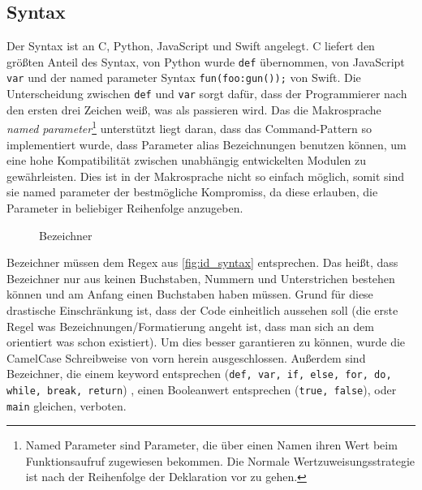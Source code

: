   \subsection{Syntax}
  \label{ssec:Syntax}
    Der Syntax ist an C, Python, JavaScript und Swift angelegt. C liefert den größten Anteil des Syntax, von Python wurde \lstinline[style=MyMacroStyle]$def$ übernommen, von JavaScript \lstinline[style=MyMacroStyle]$var$ und der named parameter Syntax \lstinline[style=MyMacroStyle]$fun(foo:gun());$ von Swift. Die Unterscheidung zwischen \lstinline[style=MyMacroStyle]$def$ und \lstinline[style=MyMacroStyle]$var$ sorgt dafür, dass der Programmierer nach den ersten drei Zeichen weiß, was als passieren wird. Das die Makrosprache \emph{named parameter}\footnote{
      Named Parameter sind Parameter, die über einen Namen ihren Wert beim Funktionsaufruf zugewiesen bekommen. Die Normale Wertzuweisungsstrategie ist nach der Reihenfolge der Deklaration vor zu gehen.
    } unterstützt liegt daran, dass das Command-Pattern so implementiert wurde, dass Parameter alias Bezeichnungen benutzen können, um eine hohe Kompatibilität zwischen unabhängig entwickelten Modulen zu gewährleisten. Dies ist in der Makrosprache nicht so einfach möglich, somit sind sie named parameter der bestmögliche Kompromiss, da diese erlauben, die Parameter in beliebiger Reihenfolge anzugeben.

    \begin{figure}[H]
      \centering
      \caption{Bezeichner}
      \label{fig:id_syntax}
    \end{figure}
    Bezeichner müssen dem Regex aus \autoref{fig:id_syntax} entsprechen. Das heißt, dass Bezeichner nur aus keinen Buchstaben, Nummern und Unterstrichen bestehen können und am Anfang einen Buchstaben haben müssen. Grund für diese drastische Einschränkung ist, dass der Code einheitlich aussehen soll (die erste Regel was Bezeichnungen/Formatierung angeht ist, dass man sich an dem orientiert was schon existiert). Um dies besser garantieren zu können, wurde die CamelCase Schreibweise von vorn herein ausgeschlossen. Außerdem sind Bezeichner, die einem keyword entsprechen (\lstinline[style=MyMacroStyle]$def, var, if, else, for, do, while, break, return$)
    , einen Booleanwert entsprechen (\lstinline[style=MyMacroStyle]$true, false$), oder \lstinline[style=MyMacroStyle]$main$ gleichen, verboten.

